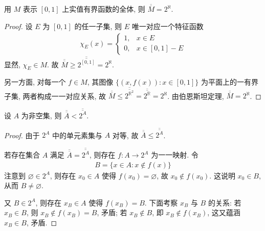 \documentclass[../../main.tex]{subfiles}
\begin{document}
\begin{example}
用 $M$ 表示 $[0, 1]$ 上实值有界函数的全体, 则 $\overline{\overline{M}} = 2^{\aleph}$.
\end{example}
\begin{proof}
设 $E$ 为 $[0, 1]$ 的任一子集, 则 $E$ 唯一对应一个特征函数
\begin{align*}
\chi_E(x) = 
\begin{cases}
1, & x \in E\\
0, & x \in [0, 1] - E
\end{cases}
\end{align*}
显然, $\chi_E \in M$. 故 $\overline{\overline{M}} \geqslant \overline{\overline{2^{[0, 1]}}} = 2^{\aleph}$.

另一方面, 对每一个 $f \in M$, 其图像 $\{(x, f(x)) : x \in [0, 1]\}$ 为平面上的一有界子集, 两者构成一一对应关系, 故 $\overline{\overline{M}} \leqslant \overline{\overline{2^{\mathbb{R}^2}}} = \overline{\overline{2^{\mathbb{R}}}} = 2^{\aleph}$. 由伯恩斯坦定理, $\overline{\overline{M}} = 2^{\aleph}$. 
\end{proof}

\begin{theorem}[无最大基数定理]\label{theorem:无最大基数定理}
设 $A$ 为非空集, 则 $\overline{\overline{A}} < \overline{\overline{2^A}}$.
\end{theorem}
\begin{proof}
由于 $2^A$ 中的单元素集与 $A$ 对等, 故 $\overline{\overline{A}} \leqslant \overline{\overline{2^A}}$.

若存在集合 $A$ 满足 $\overline{\overline{A}} = \overline{\overline{2^A}}$, 则存在 $f : A \to 2^A$ 为一一映射. 令
\begin{align*}
B = \{x \in A : x \notin f(x)\}
\end{align*}
注意到 $\varnothing \in 2^A$, 则存在 $x_0 \in A$ 使得 $f(x_0) = \varnothing$, 故 $x_0 \notin f(x_0)$. 这说明 $x_0 \in B$, 从而 $B \neq \varnothing$.

又 $B \in 2^A$, 则存在 $x_B \in A$ 使得 $f(x_B) = B$. 下面考察 $x_B$ 与 $B$ 的关系: 若 $x_B \in B$, 则 $x_B \notin f(x_B) = B$, 矛盾; 若 $x_B \notin B$, 即 $x_B \notin f(x_B)$, 这又蕴涵 $x_B \in B$, 矛盾. 
\end{proof}
\end{document}
